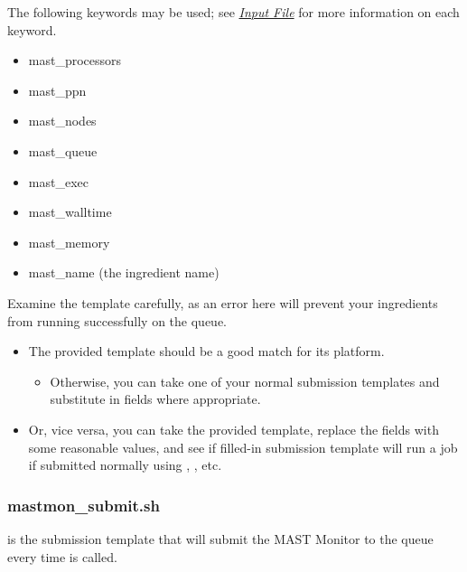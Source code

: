 \documentclass[letterpaper,10pt,english]{sphinxmanual}
\begin{document}
The following keywords may be used; see {\hyperref[3_0_inputfile::doc]{\emph{Input File}}} for more information on each keyword.
\begin{itemize}
\item {} 
mast\_processors

\item {} 
mast\_ppn

\item {} 
mast\_nodes

\item {} 
mast\_queue

\item {} 
mast\_exec

\item {} 
mast\_walltime

\item {} 
mast\_memory

\item {} 
mast\_name (the ingredient name)

\end{itemize}

Examine the template carefully, as an error here will prevent your ingredients from running successfully on the queue.
\begin{itemize}
\item {} 
The provided template should be a good match for its platform.
\begin{itemize}
\item {} 
Otherwise, you can take one of your normal submission templates and substitute in  fields where appropriate.

\end{itemize}

\item {} 
Or, vice versa, you can take the provided template, replace the  fields with some reasonable values, and see if filled-in submission template will run a job if submitted normally using , , etc.

\end{itemize}


\subsubsection{mastmon\_submit.sh}
\label{1_0_installation:mastmon-submit-sh}
 is the submission template that will submit the MAST Monitor to the queue every time  is called.
\end{document}

